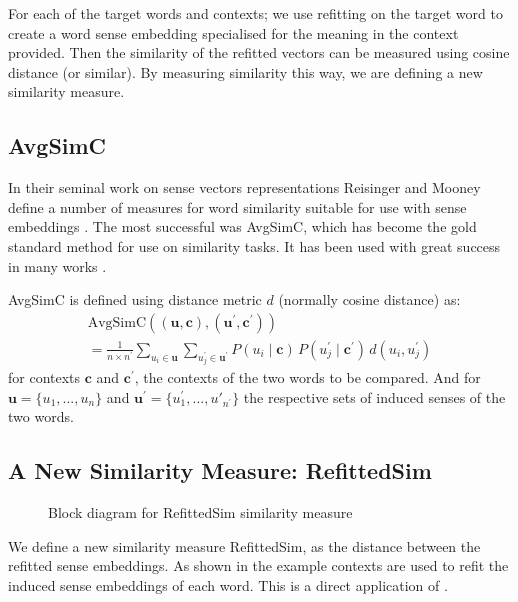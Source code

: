 \documentclass{article}
\def\parencite{\cite}
\renewcommand{\c}{\mathbf{c}}
\renewcommand{\u}{\mathbf{u}}
\begin{document}
For each of the target words and contexts; we use refitting on the target word to create a word sense embedding specialised for the meaning in the context provided. Then the similarity of the refitted vectors can be measured using cosine distance (or similar).
By measuring similarity this way, we are defining a new similarity measure.

\subsection{AvgSimC}
In their seminal work on sense vectors representations Reisinger and Mooney define a number of measures for word similarity suitable for use with sense embeddings \parencite{Reisinger2010}. The most successful was AvgSimC, which has become the gold standard method for use on similarity tasks. It has been used with great success in many works \cite{Huang2012,Chen2014,tian2014probabilistic}. 


AvgSimC is defined using distance metric $d$ (normally cosine distance) as: 
\begin{multline} \label{eq:avgsimc}
\mathrm{AvgSimC}((\u,\c),(\u^{\prime},\c^{\prime})) \\
=  \frac{1}{n \times n^{\prime}}
\sum_{u_{i}\in\u}
\sum_{u_{j}^{\prime}\in\u^{\prime}}
P(u_{i}\mid\c)\,P(u_{j}^{\prime}\mid\c^{\prime})\,d(u_{i},u_{j}^{\prime})
\end{multline}
for contexts $\c$ and $\c^\prime$, the contexts of the two words to be compared.
And for $\u=\{u_1,...,u_n\}$ and $\u^\prime=\{u^\prime_1,...,u\prime_{n^\prime}\}$ the respective sets of induced senses of the two words.


\subsection{A New Similarity Measure: RefittedSim}\label{RefittedSimVsAvgSimC}
\begin{figure}
	\begin{adjustbox}{max width=\columnwidth}
	
	\end{adjustbox}
	\caption{Block diagram for RefittedSim similarity measure} \label{diaRefittedSim}
\end{figure}
We define a new similarity measure RefittedSim, as the distance between the refitted sense embeddings.
As shown in  the example contexts are used to refit the induced sense embeddings of each word.
This is a direct application of  .
\end{document}
